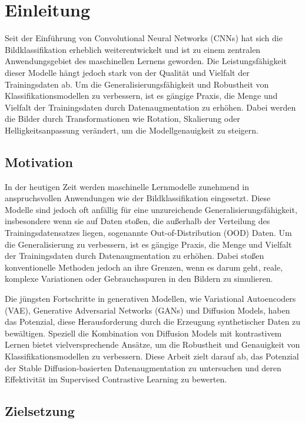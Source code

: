 \chapter{Einleitung} \label{ch:intro}

Seit der Einführung von Convolutional Neural Networks (CNNs) hat sich die Bildklassifikation erheblich weiterentwickelt und ist zu einem zentralen Anwendungsgebiet des maschinellen Lernens geworden. Die Leistungsfähigkeit dieser Modelle hängt jedoch stark von der Qualität und Vielfalt der Trainingsdaten ab. Um die Generalisierungsfähigkeit und Robustheit von Klassifikationsmodellen zu verbessern, ist es gängige Praxis, die Menge und Vielfalt der Trainingsdaten durch Datenaugmentation zu erhöhen. Dabei werden die Bilder durch Transformationen wie Rotation, Skalierung oder Helligkeitsanpassung verändert, um die Modellgenauigkeit zu steigern.

\section{Motivation} \label{sec:motivation}

In der heutigen Zeit werden maschinelle Lernmodelle zunehmend in anspruchsvollen Anwendungen wie der Bildklassifikation eingesetzt. Diese Modelle sind jedoch oft anfällig für eine unzureichende Generalisierungsfähigkeit, insbesondere wenn sie auf Daten stoßen, die außerhalb der Verteilung des Trainingsdatensatzes liegen, sogenannte Out-of-Distribution (OOD) Daten. Um die Generalisierung zu verbessern, ist es gängige Praxis, die Menge und Vielfalt der Trainingsdaten durch Datenaugmentation zu erhöhen. Dabei stoßen konventionelle Methoden jedoch an ihre Grenzen, wenn es darum geht, reale, komplexe Variationen oder Gebrauchsspuren in den Bildern zu simulieren.

Die jüngsten Fortschritte in generativen Modellen, wie Variational Autoencoders (VAE), Generative Adversarial Networks (GANs) und Diffusion Models, haben das Potenzial, diese Herausforderung durch die Erzeugung synthetischer Daten zu bewältigen. Speziell die Kombination von Diffusion Models mit kontrastivem Lernen bietet vielversprechende Ansätze, um die Robustheit und Genauigkeit von Klassifikationsmodellen zu verbessern. Diese Arbeit zielt darauf ab, das Potenzial der Stable Diffusion-basierten Datenaugmentation zu untersuchen und deren Effektivität im Supervised Contrastive Learning zu bewerten.

\section{Zielsetzung} \label{sec:goal}

